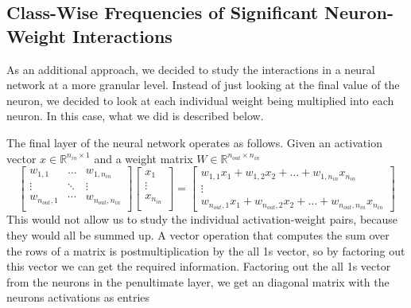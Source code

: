\documentclass{article}
\begin{document}
        
        \subsection{Class-Wise Frequencies of Significant Neuron-Weight Interactions}
            As an additional approach, we decided to study the interactions in a neural network at a more granular level. Instead of just looking at the final value of the neuron, we decided to look at each individual weight being multiplied into each neuron. In this case, what we did is described below. 

            The final layer of the neural network operates as follows. Given an activation vector $x \in \mathbb{R}^{n_{in} \times 1}$ and a weight matrix $W \in \mathbb{R}^{n_{out} \times n_{in}}$ 
                \[
                    \begin{bmatrix}
                        w_{1,1} & \dots & w_{1,n_{in}} \\
                        \vdots & \ddots & \vdots \\
                        w_{n_{out}, 1} & \cdots & w_{n_{out}, n_{in}} \\
                    \end{bmatrix}
                    \begin{bmatrix}
                        x_1 \\
                        \vdots \\
                        x_{n_{in}} \\
                    \end{bmatrix}
                    = 
                    \begin{bmatrix}
                        w_{1,1}x_1 + w_{1, 2}x_2 + \dots + w_{1, n_{in}}x_{n_{in}} \\
                        \vdots \\
                        w_{n_{out},1}x_1 + w_{n_{out}, 2}x_2 + \dots + w_{n_{out}, n_{in}}x_{n_{in}}
                    \end{bmatrix}
                \]
                This would not allow us to study the individual activation-weight pairs, because they would all be summed up. A vector operation that computes the sum over the rows of a matrix is postmultiplication by the all 1s vector, so by factoring out this vector we can get the required information. Factoring out the all 1s vector from the neurons in the penultimate layer, we get an diagonal matrix with the neurons activations as entries 
\end{document}
